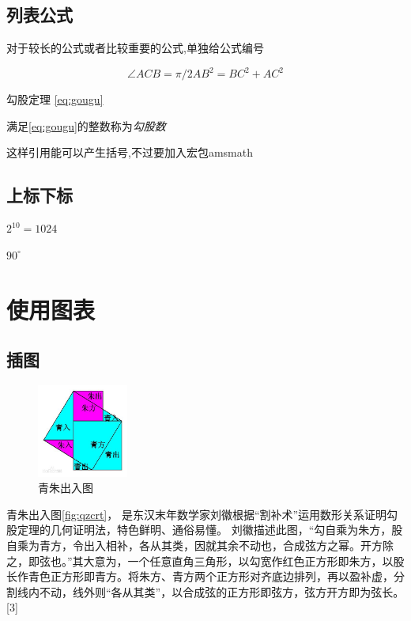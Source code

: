 \documentclass[UTF8]{ctexart}
\begin{document}
    \subsection{列表公式}
      对于较长的公式或者比较重要的公式,单独给公式编号

      \begin{equation}\label{eq:gougu}
        \angle ACB = \pi /2

        AB^2 = BC^2 + AC^2
      \end{equation}

      勾股定理 \ref{eq:gougu} %

      满足\eqref{eq:gougu}的整数称为\emph{勾股数}

      这样引用能可以产生括号,不过要加入宏包amsmath
    \subsection{上标下标}

      $2^{10} = 1024$

      $90^\circ$
  \section{使用图表}

      \subsection{插图}

        \begin{figure}[ht]%
          \centering%
          \includegraphics[width=3cm]{pythagorean_theorem.jpg}
          \caption{青朱出入图}%
        \end{figure}
      青朱出入图\ref{fig:qzcrt}，
      是东汉末年数学家刘徽根据“割补术”运用数形关系证明勾股定理的几何证明法，特色鲜明、通俗易懂。
      刘徽描述此图，“勾自乘为朱方，股自乘为青方，令出入相补，各从其类，因就其余不动也，合成弦方之幂。开方除之，即弦也。”其大意为，一个任意直角三角形，以勾宽作红色正方形即朱方，以股长作青色正方形即青方。将朱方、青方两个正方形对齐底边排列，再以盈补虚，分割线内不动，线外则“各从其类”，以合成弦的正方形即弦方，弦方开方即为弦长。 [3]
\end{document}
